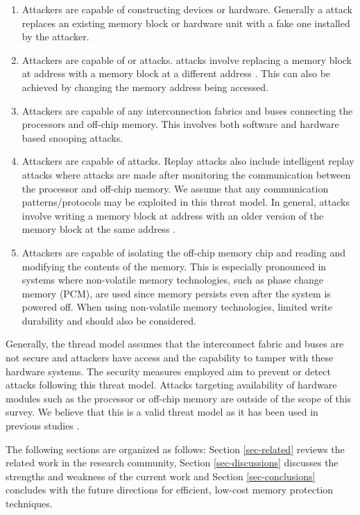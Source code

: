 \begin{enumerate}[noitemsep, topsep=0pt]
  \item Attackers are capable of constructing  devices or
    hardware. Generally a  attack replaces an existing memory
    block or hardware unit with a fake one installed by the attacker.
  \item Attackers are capable of  or  attacks.
     attacks involve replacing a memory block at
    address  with a memory block at a different address . This can
    also be achieved by changing the memory address being accessed.
  \item Attackers are capable of  any interconnection fabrics and
    buses connecting the processors and off-chip memory. This involves both
    software and hardware based snooping attacks.
  \item Attackers are capable of  attacks. Replay attacks also
    include intelligent replay attacks where attacks are made after monitoring
    the communication between the processor and off-chip memory. We assume that
    any communication patterns/protocols may be exploited in this threat model.
    In general,  attacks involve writing a memory block at address
     with an older version of the memory block at the same address
    .
  \item Attackers are capable of isolating the off-chip memory chip and reading
    and modifying the contents of the memory. This is especially pronounced in
    systems where non-volatile memory technologies, such as phase change memory
    (PCM), are used since memory persists even after the system is powered off.
    When using non-volatile memory technologies, limited write durability and
    should also be considered.
\end{enumerate}

Generally, the thread model assumes that the interconnect fabric and buses are
not secure and attackers have access and the capability to tamper with these
hardware systems. The security measures employed aim to prevent or detect
attacks following this threat model. Attacks targeting availability of
hardware modules such as the processor or off-chip memory are outside of the
scope of this survey. We believe that this is a valid threat model as it has
been used in previous studies \cite{surveyInt}.

The following sections are organized as follows: Section
\ref{sec-related} reviews the related work in the research community, Section
\ref{sec-discussions} discusses the strengths and weakness of the current work
and Section \ref{sec-conclusions} concludes with the future directions for
efficient, low-cost memory protection techniques.
